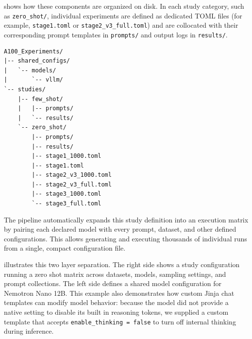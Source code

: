  shows how these components are organized on disk. In each study category, such as \texttt{zero\_shot/}, individual experiments are defined as dedicated TOML files (for example, \texttt{stage1.toml} or \texttt{stage2\_v3\_full.toml}) and are collocated with their corresponding prompt templates in \texttt{prompts/} and output logs in \texttt{results/}.

\begin{lstlisting}[basicstyle=\ttfamily\scriptsize,breaklines=true,frame=single,caption={Directory layout of the experimental framework.},label={lst:dir_structure}]
A100_Experiments/
|-- shared_configs/
|   `-- models/
|       `-- vllm/
`-- studies/
    |-- few_shot/
    |   |-- prompts/
    |   `-- results/
    `-- zero_shot/
        |-- prompts/
        |-- results/
        |-- stage1_1000.toml
        |-- stage1.toml
        |-- stage2_v3_1000.toml
        |-- stage2_v3_full.toml
        |-- stage3_1000.toml
        `-- stage3_full.toml
\end{lstlisting}

The pipeline automatically expands this study definition into an execution matrix by pairing each declared model with every prompt, dataset, and other defined configurations. This allows generating and executing thousands of individual runs from a single, compact configuration file.

 illustrates this two layer separation. The right side shows a study configuration running a zero shot matrix across datasets, models, sampling settings, and prompt collections. The left side defines a shared model configuration for Nemotron Nano 12B. This example also demonstrates how custom Jinja chat templates can modify model behavior: because the model did not provide a native setting to disable its built in reasoning tokens, we supplied a custom template that accepts \texttt{enable\_thinking = false} to turn off internal thinking during inference.

